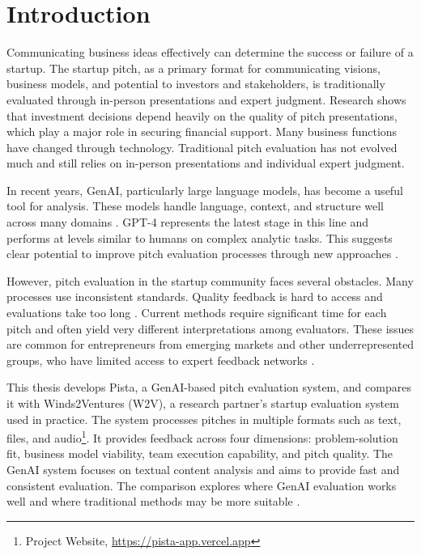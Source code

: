 \chapter{Introduction}

\label{ch:introduction}

Communicating business ideas effectively can determine the success or failure of a startup. The startup pitch, as a primary format for communicating visions, business models, and potential to investors and stakeholders, is traditionally evaluated through in-person presentations and expert judgment. Research shows that investment decisions depend heavily on the quality of pitch presentations, which play a major role in securing financial support\cite{masterpresentat}. Many business functions have changed through technology. Traditional pitch evaluation has not evolved much and still relies on in-person presentations and individual expert judgment.



In recent years, GenAI, particularly large language models, has become a useful tool for analysis. These models handle language, context, and structure well across many domains \cite{Ozince2024}. GPT-4 represents the latest stage in this line and performs at levels similar to humans on complex analytic tasks. This suggests clear potential to improve pitch evaluation processes through new approaches \cite{gpt}.



However, pitch evaluation in the startup community faces several obstacles. Many processes use inconsistent standards. Quality feedback is hard to access and evaluations take too long \cite{StartupEvaluati, Kalvapalle2024}. Current methods require significant time for each pitch and often yield very different interpretations among evaluators. These issues are common for entrepreneurs from emerging markets and other underrepresented groups, who have limited access to expert feedback networks \cite{BreakingBarrier}.



This thesis develops Pista, a GenAI-based pitch evaluation system, and compares it with Winds2Ventures (W2V), a research partner’s startup evaluation system used in practice. The system processes pitches in multiple formats such as text, files, and audio\footnote{Project Website, \url{https://pista-app.vercel.app}}. It provides feedback across four dimensions: problem-solution fit, business model viability, team execution capability, and pitch quality. The GenAI system focuses on textual content analysis and aims to provide fast and consistent evaluation. The comparison explores where GenAI evaluation works well and where traditional methods may be more suitable \cite{TheFutureofAIEv}.

